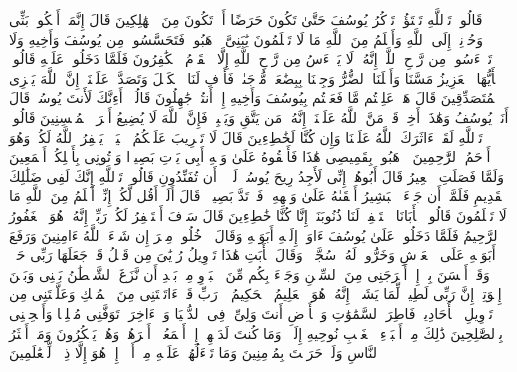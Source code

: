 \startbuffer[\q:12:85]
قَالُوا۟ تَٱللَّهِ تَفۡتَؤُا۟ تَذۡكُرُ یُوسُفَ حَتَّىٰ تَكُونَ حَرَضًا أَوۡ تَكُونَ مِنَ ٱلۡهَٰلِكِینَ%
\stopbuffer
\startbuffer[\q:12:86]
قَالَ إِنَّمَاۤ أَشۡكُوا۟ بَثِّی وَحُزۡنِیۤ إِلَى ٱللَّهِ وَأَعۡلَمُ مِنَ ٱللَّهِ مَا لَا تَعۡلَمُونَ%
\stopbuffer
\startbuffer[\q:12:87]
یَٰبَنِیَّ ٱذۡهَبُوا۟ فَتَحَسَّسُوا۟ مِن یُوسُفَ وَأَخِیهِ وَلَا تَا۟یۡءَسُوا۟ مِن رَّوۡحِ ٱللَّهِۖ إِنَّهُۥ لَا یَا۟یۡءَسُ مِن رَّوۡحِ ٱللَّهِ إِلَّا ٱلۡقَوۡمُ ٱلۡكَٰفِرُونَ%
\stopbuffer
\startbuffer[\q:12:88]
فَلَمَّا دَخَلُوا۟ عَلَیۡهِ قَالُوا۟ یَٰۤأَیُّهَا ٱلۡعَزِیزُ مَسَّنَا وَأَهۡلَنَا ٱلضُّرُّ وَجِئۡنَا بِبِضَٰعَةࣲ مُّزۡجَىٰةࣲ فَأَوۡفِ لَنَا ٱلۡكَیۡلَ وَتَصَدَّقۡ عَلَیۡنَاۤۖ إِنَّ ٱللَّهَ یَجۡزِی ٱلۡمُتَصَدِّقِینَ%
\stopbuffer
\startbuffer[\q:12:89]
قَالَ هَلۡ عَلِمۡتُم مَّا فَعَلۡتُم بِیُوسُفَ وَأَخِیهِ إِذۡ أَنتُمۡ جَٰهِلُونَ%
\stopbuffer
\startbuffer[\q:12:90]
قَالُوۤا۟ أَءِنَّكَ لَأَنتَ یُوسُفُۖ قَالَ أَنَا۠ یُوسُفُ وَهَٰذَاۤ أَخِیۖ قَدۡ مَنَّ ٱللَّهُ عَلَیۡنَاۤۖ إِنَّهُۥ مَن یَتَّقِ وَیَصۡبِرۡ فَإِنَّ ٱللَّهَ لَا یُضِیعُ أَجۡرَ ٱلۡمُحۡسِنِینَ%
\stopbuffer
\startbuffer[\q:12:91]
قَالُوا۟ تَٱللَّهِ لَقَدۡ ءَاثَرَكَ ٱللَّهُ عَلَیۡنَا وَإِن كُنَّا لَخَٰطِءِینَ%
\stopbuffer
\startbuffer[\q:12:92]
قَالَ لَا تَثۡرِیبَ عَلَیۡكُمُ ٱلۡیَوۡمَۖ یَغۡفِرُ ٱللَّهُ لَكُمۡۖ وَهُوَ أَرۡحَمُ ٱلرَّٰحِمِینَ%
\stopbuffer
\startbuffer[\q:12:93]
ٱذۡهَبُوا۟ بِقَمِیصِی هَٰذَا فَأَلۡقُوهُ عَلَىٰ وَجۡهِ أَبِی یَأۡتِ بَصِیرࣰا وَأۡتُونِی بِأَهۡلِكُمۡ أَجۡمَعِینَ%
\stopbuffer
\startbuffer[\q:12:94]
وَلَمَّا فَصَلَتِ ٱلۡعِیرُ قَالَ أَبُوهُمۡ إِنِّی لَأَجِدُ رِیحَ یُوسُفَۖ لَوۡلَاۤ أَن تُفَنِّدُونِ%
\stopbuffer
\startbuffer[\q:12:95]
قَالُوا۟ تَٱللَّهِ إِنَّكَ لَفِی ضَلَٰلِكَ ٱلۡقَدِیمِ%
\stopbuffer
\startbuffer[\q:12:96]
فَلَمَّاۤ أَن جَاۤءَ ٱلۡبَشِیرُ أَلۡقَىٰهُ عَلَىٰ وَجۡهِهِۦ فَٱرۡتَدَّ بَصِیرࣰاۖ قَالَ أَلَمۡ أَقُل لَّكُمۡ إِنِّیۤ أَعۡلَمُ مِنَ ٱللَّهِ مَا لَا تَعۡلَمُونَ%
\stopbuffer
\startbuffer[\q:12:97]
قَالُوا۟ یَٰۤأَبَانَا ٱسۡتَغۡفِرۡ لَنَا ذُنُوبَنَاۤ إِنَّا كُنَّا خَٰطِءِینَ%
\stopbuffer
\startbuffer[\q:12:98]
قَالَ سَوۡفَ أَسۡتَغۡفِرُ لَكُمۡ رَبِّیۤۖ إِنَّهُۥ هُوَ ٱلۡغَفُورُ ٱلرَّحِیمُ%
\stopbuffer
\startbuffer[\q:12:99]
فَلَمَّا دَخَلُوا۟ عَلَىٰ یُوسُفَ ءَاوَىٰۤ إِلَیۡهِ أَبَوَیۡهِ وَقَالَ ٱدۡخُلُوا۟ مِصۡرَ إِن شَاۤءَ ٱللَّهُ ءَامِنِینَ%
\stopbuffer
\startbuffer[\q:12:100]
وَرَفَعَ أَبَوَیۡهِ عَلَى ٱلۡعَرۡشِ وَخَرُّوا۟ لَهُۥ سُجَّدࣰاۖ وَقَالَ یَٰۤأَبَتِ هَٰذَا تَأۡوِیلُ رُءۡیَٰیَ مِن قَبۡلُ قَدۡ جَعَلَهَا رَبِّی حَقࣰّاۖ وَقَدۡ أَحۡسَنَ بِیۤ إِذۡ أَخۡرَجَنِی مِنَ ٱلسِّجۡنِ وَجَاۤءَ بِكُم مِّنَ ٱلۡبَدۡوِ مِنۢ بَعۡدِ أَن نَّزَغَ ٱلشَّیۡطَٰنُ بَیۡنِی وَبَیۡنَ إِخۡوَتِیۤۚ إِنَّ رَبِّی لَطِیفࣱ لِّمَا یَشَاۤءُۚ إِنَّهُۥ هُوَ ٱلۡعَلِیمُ ٱلۡحَكِیمُ%
\stopbuffer
\startbuffer[\q:12:101]
۞ رَبِّ قَدۡ ءَاتَیۡتَنِی مِنَ ٱلۡمُلۡكِ وَعَلَّمۡتَنِی مِن تَأۡوِیلِ ٱلۡأَحَادِیثِۚ فَاطِرَ ٱلسَّمَٰوَٰتِ وَٱلۡأَرۡضِ أَنتَ وَلِیِّۦ فِی ٱلدُّنۡیَا وَٱلۡءَاخِرَةِۖ تَوَفَّنِی مُسۡلِمࣰا وَأَلۡحِقۡنِی بِٱلصَّٰلِحِینَ%
\stopbuffer
\startbuffer[\q:12:102]
ذَٰلِكَ مِنۡ أَنۢبَاۤءِ ٱلۡغَیۡبِ نُوحِیهِ إِلَیۡكَۖ وَمَا كُنتَ لَدَیۡهِمۡ إِذۡ أَجۡمَعُوۤا۟ أَمۡرَهُمۡ وَهُمۡ یَمۡكُرُونَ%
\stopbuffer
\startbuffer[\q:12:103]
وَمَاۤ أَكۡثَرُ ٱلنَّاسِ وَلَوۡ حَرَصۡتَ بِمُؤۡمِنِینَ%
\stopbuffer
\startbuffer[\q:12:104]
وَمَا تَسۡءَلُهُمۡ عَلَیۡهِ مِنۡ أَجۡرٍۚ إِنۡ هُوَ إِلَّا ذِكۡرࣱ لِّلۡعَٰلَمِینَ%
\stopbuffer
